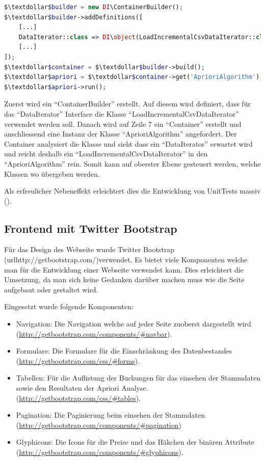 \begin{lstlisting}[language=php]
$\textdollar$builder = new DI\ContainerBuilder();
$\textdollar$builder->addDefinitions([
    [...]
    DataIterator::class => DI\object(LoadIncrementalCsvDataIterator::class),
    [...]
]);
$\textdollar$container = $\textdollar$builder->build();
$\textdollar$apriori = $\textdollar$container->get('AprioriAlgorithm');
$\textdollar$apriori->run();
\end{lstlisting}

Zuerst wird ein "`ContainerBuilder"' erstellt. Auf diesem wird definiert, dass für das "`DataIterator"' Interface die Klasse "`LoadIncrementalCsvDataIterator"' verwendet werden soll. Danach wird auf Zeile 7 ein "`Container"' erstellt und anschliessend eine Instanz der Klasse "`AprioriAlgorithm"' angefordert. Der Container analysiert die Klasse und sieht dass ein "`DataIterator"' erwartet wird und reicht deshalb ein "`LoadIncrementalCsvDataIterator"' in den "`AprioriAlgorithm"' rein. Somit kann auf oberster Ebene gesteuert werden, welche Klassen wo übergeben werden.

Als erfreulicher Nebeneffekt erleichtert dies die Entwicklung von UnitTests massiv ().

\subsection{Frontend mit Twitter Bootstrap}
Für das Design des Webseite wurde Twitter Bootstrap (url{http://getbootstrap.com/})verwendet. Es bietet viele Komponenten welche man für die Entwicklung einer Webseite verwendet kann. Dies erleichtert die Umsetzung, da man sich keine Gedanken darüber machen muss wie die Seite aufgebaut oder gestaltet wird. 

Eingesetzt wurde folgende Komponenten:
\begin{itemize}
	\item Navigation: Die Navigation welche auf jeder Seite zuoberst dargestellt wird (\url{http://getbootstrap.com/components/#navbar}).
	\item Formulare: Die Formulare für die Einschränkung des Datenbestandes (\url{http://getbootstrap.com/css/#forms}).
	\item Tabellen: Für die Auflistung der Buchungen für das einsehen der Stammdaten sowie den Resultaten der Apriori Analyse. (\url{http://getbootstrap.com/css/#tables}).
	\item Pagination: Die Paginierung beim einsehen der Stammdaten (\url{http://getbootstrap.com/components/#pagination})
	\item Glyphicons: Die Icons für die Preise und das Häkchen der binären Attribute (\url{http://getbootstrap.com/components/#glyphicons}).
\end{itemize}

